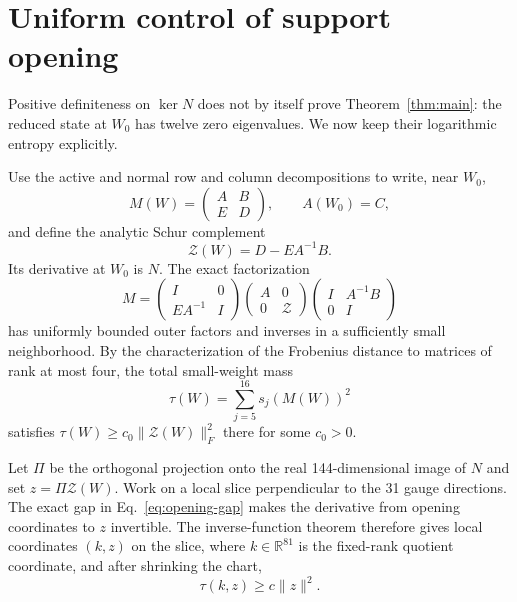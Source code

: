 \documentclass[11pt]{article}
\begin{document}
\section{Uniform control of support opening}

Positive definiteness on $\ker N$ does not by itself prove
Theorem~\ref{thm:main}: the reduced state at $W_0$ has twelve zero
eigenvalues.  We now keep their logarithmic entropy explicitly.

Use the active and normal row and column decompositions to write, near $W_0$,
\begin{equation}
 M(W)=\begin{pmatrix}A&B\\E&D\end{pmatrix},\qquad A(W_0)=C,
\end{equation}
and define the analytic Schur complement
\begin{equation}
 \mathcal Z(W)=D-EA^{-1}B.
 \label{eq:schur}
\end{equation}
Its derivative at $W_0$ is $N$.  The exact factorization
\begin{equation}
 M=
 \begin{pmatrix}I&0\\EA^{-1}&I\end{pmatrix}
 \begin{pmatrix}A&0\\0&\mathcal Z\end{pmatrix}
 \begin{pmatrix}I&A^{-1}B\\0&I\end{pmatrix}
 \label{eq:blockfact}
\end{equation}
has uniformly bounded outer factors and inverses in a sufficiently small
neighborhood.  By the characterization of the Frobenius distance to matrices
of rank at most four, the total small-weight mass
\begin{equation}
 \tau(W)=\sum_{j=5}^{16}s_j(M(W))^2
 \label{eq:tau}
\end{equation}
satisfies $\tau(W)\geq c_0\lVert\mathcal Z(W)\rVert_F^2$ there for some
$c_0>0$.

Let $\Pi$ be the orthogonal projection onto the real 144-dimensional image of
$N$ and set $z=\Pi\mathcal Z(W)$.  Work on a local slice perpendicular to the
31 gauge directions.  The exact gap in Eq.~\eqref{eq:opening-gap} makes the
derivative from opening coordinates to $z$ invertible.  The inverse-function
theorem therefore gives local coordinates $(k,z)$ on the slice, where
$k\in\mathbb R^{81}$ is the fixed-rank quotient coordinate, and after
shrinking the chart,
\begin{equation}
 \tau(k,z)\geq c\lVert z\rVert^2.
 \label{eq:taulower}
\end{equation}
\end{document}
